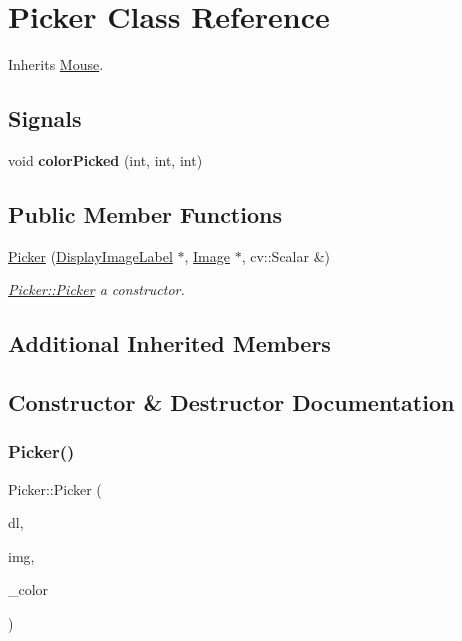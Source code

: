 \hypertarget{class_picker}{}\section{Picker Class Reference}
\label{class_picker}


Inherits \mbox{\hyperlink{class_mouse}{Mouse}}.

\subsection*{Signals}
\begin{DoxyCompactItemize}
\item 
\mbox{\label{class_picker_a0883983a3697f417dbd862a4687ad59a}} 
void {\bfseries color\+Picked} (int, int, int)
\end{DoxyCompactItemize}
\subsection*{Public Member Functions}
\begin{DoxyCompactItemize}
\item 
\mbox{\hyperlink{class_picker_addfa0e5856d66c16a6ead91a17960d97}{Picker}} (\mbox{\hyperlink{class_display_image_label}{Display\+Image\+Label}} $\ast$, \mbox{\hyperlink{class_image}{Image}} $\ast$, cv\+::\+Scalar \&)
\begin{DoxyCompactList}\small\item\em \mbox{\hyperlink{class_picker_addfa0e5856d66c16a6ead91a17960d97}{Picker\+::\+Picker}} a constructor. \end{DoxyCompactList}\end{DoxyCompactItemize}
\subsection*{Additional Inherited Members}


\subsection{Constructor \& Destructor Documentation}
\mbox{\label{class_picker_addfa0e5856d66c16a6ead91a17960d97}} 
\subsubsection{\texorpdfstring{Picker()}{Picker()}}
{\footnotesize\ttfamily Picker\+::\+Picker (\begin{DoxyParamCaption}\item[{\mbox{\hyperlink{class_display_image_label}{Display\+Image\+Label}} $\ast$}]{dl,  }\item[{\mbox{\hyperlink{class_image}{Image}} $\ast$}]{img,  }\item[{cv\+::\+Scalar \&}]{\+\_\+color }\end{DoxyParamCaption})}



